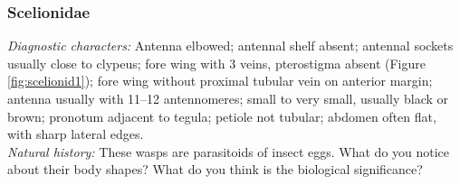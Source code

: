 \documentclass[letterpaper, 11pt]{article}
\begin{document}
\subsubsection{Scelionidae}
\noindent{}\textit{Diagnostic characters:} Antenna elbowed; antennal shelf absent; antennal sockets usually close to clypeus; fore wing with 3 veins, pterostigma absent (Figure \ref{fig:scelionid1}); fore wing without proximal tubular vein on anterior margin; antenna usually with 11--12 antennomeres; small to very small, usually black or brown; pronotum adjacent to tegula; petiole not tubular; abdomen often flat, with sharp lateral edges.\\

\noindent{}\textit{Natural history:} These wasps are parasitoids of insect eggs. What do you notice about their body shapes? What do you think is the biological significance?\\
\end{document}
